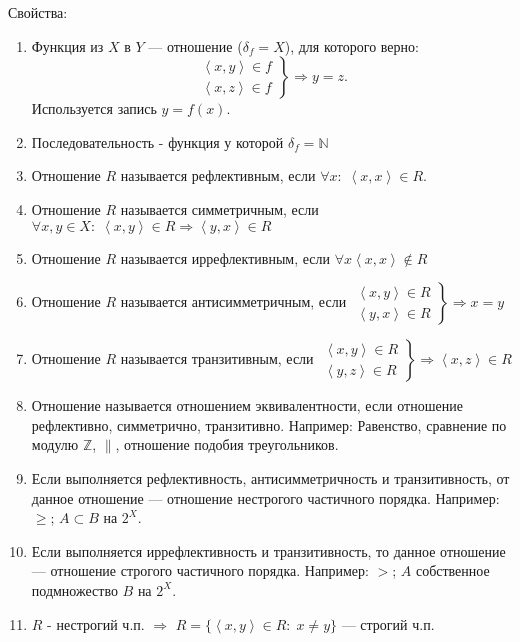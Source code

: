 \documentclass[12pt]{article}
\begin{document}
Свойства:
\begin{enumerate}
    \item Функция из $X$ в  $Y$ --- отношение ($\delta_f = X$), для которого верно:
    \[
    \left. \begin{array}{l} \left<x,y\right> \in f \\ \left<x, z\right> \in f \end{array} \right\} \Rightarrow y = z
    .\]
    Используется запись $y = f(x)$. 
    \item Последовательность - функция у которой $\delta_f = \mathbb{N}$
    \item Отношение $R$ называется рефлективным, если $\forall x: \; \left<x, x\right> \in R$.
    \item Отношение $R$ называется симметричным, если  $\forall x, y \in X: \; \left<x, y\right> \in R \Rightarrow \left<y, x\right> \in R$
    \item Отношение $R$ называется иррефлективным, если  $\forall x \left<x,x\right> \notin R$
    \item Отношение $R$ называется антисимметричным, если  $\left. \begin{array}{r} \left<x, y\right> \in R \\ \left<y, x\right> \in R\end{array} \right\} \Rightarrow x = y$
    \item Отношение $R$ называется транзитивным, если  $\left. \begin{array}{r} \left<x, y\right> \in R \\ \left<y, z\right> \in R\end{array} \right\} \Rightarrow \left<x, z\right> \in R$\\
    \item Отношение называется отношением эквивалентности, если отношение рефлективно, симметрично, транзитивно. Например: Равенство, сравнение по модулю $\mathbb{Z}$,  $\|$, отношение подобия треугольников.
    \item Если выполняется рефлективность, антисимметричность и транзитивность, от данное отношение --- отношение нестрогого частичного порядка. Например: $\ge$; $A \subset B$ на $2^X$.
    \item Если выполняется иррефлективность и транзитивность, то данное отношение --- отношение строгого частичного порядка. Например: $>$;  $A$ собственное подмножество  $B$ на  $2^X$.
    \item $R$ - нестрогий ч.п.  $\Rightarrow$ $R = \{\left<x,y\right> \in R: \; x \neq y\}$ --- строгий ч.п.
\end{enumerate}
\end{document}
